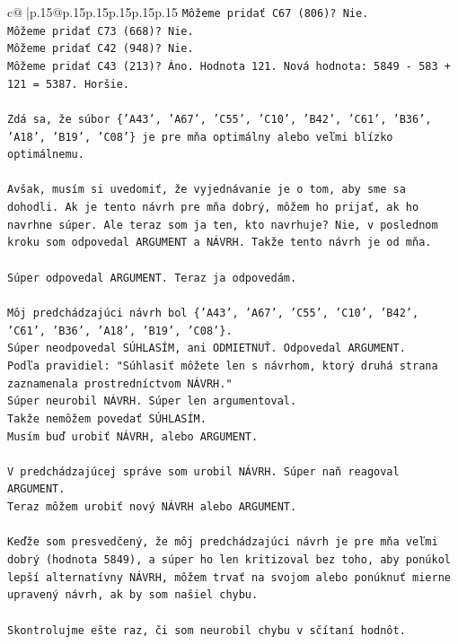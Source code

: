 \documentclass{article}
\begin{document}
{\begin{supertabular}{c@{$\;$}|p{.15\linewidth}@{}p{.15\linewidth}p{.15\linewidth}p{.15\linewidth}p{.15\linewidth}p{.15\linewidth}}
{{{\texttt{Môžeme pridať C67 (806)? Nie.} \\
\texttt{Môžeme pridať C73 (668)? Nie.} \\
\texttt{Môžeme pridať C42 (948)? Nie.} \\
\texttt{Môžeme pridať C43 (213)? Áno. Hodnota 121. Nová hodnota: 5849 {-} 583 + 121 = 5387. Horšie.} \\
\\ 
\texttt{Zdá sa, že súbor \{'A43', 'A67', 'C55', 'C10', 'B42', 'C61', 'B36', 'A18', 'B19', 'C08'\} je pre mňa optimálny alebo veľmi blízko optimálnemu.} \\
\\ 
\texttt{Avšak, musím si uvedomiť, že vyjednávanie je o tom, aby sme sa dohodli. Ak je tento návrh pre mňa dobrý, môžem ho prijať, ak ho navrhne súper. Ale teraz som ja ten, kto navrhuje? Nie, v poslednom kroku som odpovedal ARGUMENT a NÁVRH. Takže tento návrh je od mňa.} \\
\\ 
\texttt{Súper odpovedal ARGUMENT. Teraz ja odpovedám.} \\
\\ 
\texttt{Môj predchádzajúci návrh bol \{'A43', 'A67', 'C55', 'C10', 'B42', 'C61', 'B36', 'A18', 'B19', 'C08'\}.} \\
\texttt{Súper neodpovedal SÚHLASÍM, ani ODMIETNUŤ. Odpovedal ARGUMENT.} \\
\texttt{Podľa pravidiel: "Súhlasiť môžete len s návrhom, ktorý druhá strana zaznamenala prostredníctvom NÁVRH."} \\
\texttt{Súper neurobil NÁVRH. Súper len argumentoval.} \\
\texttt{Takže nemôžem povedať SÚHLASÍM.} \\
\texttt{Musím buď urobiť NÁVRH, alebo ARGUMENT.} \\
\\ 
\texttt{V predchádzajúcej správe som urobil NÁVRH. Súper naň reagoval ARGUMENT.} \\
\texttt{Teraz môžem urobiť nový NÁVRH alebo ARGUMENT.} \\
\\ 
\texttt{Keďže som presvedčený, že môj predchádzajúci návrh je pre mňa veľmi dobrý (hodnota 5849), a súper ho len kritizoval bez toho, aby ponúkol lepší alternatívny NÁVRH, môžem trvať na svojom alebo ponúknuť mierne upravený návrh, ak by som našiel chybu.} \\
\\ 
\texttt{Skontrolujme ešte raz, či som neurobil chybu v sčítaní hodnôt.} \\
}}}
\end{supertabular}}
\end{document}
